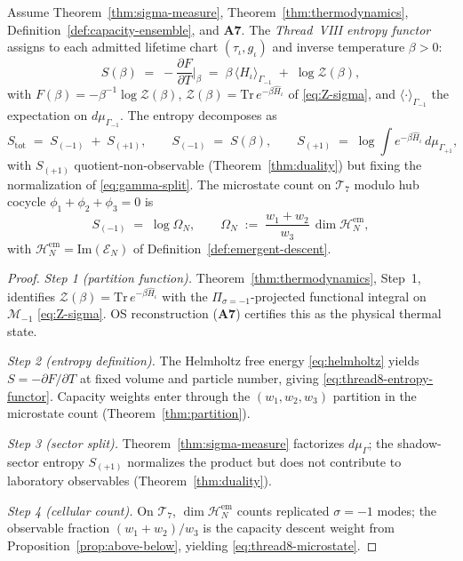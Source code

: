 \begin{theorem}
\label{thm:thread-8-entropy}
Assume Theorem~\ref{thm:sigma-measure}, Theorem~\ref{thm:thermodynamics},
Definition~\ref{def:capacity-ensemble}, and \textbf{A7}. The
\emph{Thread~VIII entropy functor} assigns to each admitted lifetime chart
$(\tau_\iota,g_\iota)$ and inverse temperature $\beta>0$:
\begin{equation}\label{eq:thread8-entropy-functor}
  S(\beta)
  \;=\;
  -\frac{\partial F}{\partial T}\Big|_{\beta}
  \;=\;
  \beta\,\langle\hat H_\iota\rangle_{\Gamma_{-1}}
  \;+\;
  \log\mathcal{Z}(\beta),
\end{equation}
with $F(\beta)=-\beta^{-1}\log\mathcal{Z}(\beta)$,
$\mathcal{Z}(\beta)=\mathrm{Tr}\,e^{-\beta\hat H_\iota}$ of
\eqref{eq:Z-sigma}, and $\langle\cdot\rangle_{\Gamma_{-1}}$ the expectation
on $d\mu_{\Gamma_{-1}}$. The entropy decomposes as
\begin{equation}\label{eq:thread8-entropy-split}
  S_{\mathrm{tot}}
  \;=\;
  S_{(-1)}
  \;+\;
  S_{(+1)},
  \qquad
  S_{(-1)}
  \;=\;
  S(\beta),
  \qquad
  S_{(+1)}
  \;=\;
  \log\!\int e^{-\beta\hat H_\iota}\,d\mu_{\Gamma_{+1}},
\end{equation}
with $S_{(+1)}$ quotient-non-observable (Theorem~\ref{thm:duality}) but
fixing the normalization of \eqref{eq:gamma-split}. The microstate count on
$\mathcal{T}_7$ modulo hub cocycle $\phi_1+\phi_2+\phi_3=0$ is
\begin{equation}\label{eq:thread8-microstate}
  S_{(-1)}
  \;=\;
  \log\Omega_N,
  \qquad
  \Omega_N
  \;:=\;
  \frac{w_1+w_2}{w_3}\,
  \dim\mathcal{H}_N^{\mathrm{em}},
\end{equation}
with $\mathcal{H}_N^{\mathrm{em}}=\mathrm{Im}(\mathcal{E}_N)$ of
Definition~\ref{def:emergent-descent}.
\end{theorem}

\begin{proof}
\emph{Step 1 (partition function).}
Theorem~\ref{thm:thermodynamics}, Step~1, identifies
$\mathcal{Z}(\beta)=\mathrm{Tr}\,e^{-\beta\hat H_\iota}$ with the
$\Pi_{\sigma=-1}$-projected functional integral on $\mathcal{M}_{-1}$
\eqref{eq:Z-sigma}. OS reconstruction (\textbf{A7}) certifies this as the
physical thermal state.

\emph{Step 2 (entropy definition).}
The Helmholtz free energy \eqref{eq:helmholtz} yields
$S=-\partial F/\partial T$ at fixed volume and particle number, giving
\eqref{eq:thread8-entropy-functor}. Capacity weights enter through the
$(w_1,w_2,w_3)$ partition in the microstate count
(Theorem~\ref{thm:partition}).

\emph{Step 3 (sector split).}
Theorem~\ref{thm:sigma-measure} factorizes $d\mu_\Gamma$; the shadow-sector
entropy $S_{(+1)}$ normalizes the product but does not contribute to
laboratory observables (Theorem~\ref{thm:duality}).

\emph{Step 4 (cellular count).}
On $\mathcal{T}_7$, $\dim\mathcal{H}_N^{\mathrm{em}}$ counts replicated
$\sigma=-1$ modes; the observable fraction $(w_1+w_2)/w_3$ is the capacity
descent weight from Proposition~\ref{prop:above-below}, yielding
\eqref{eq:thread8-microstate}.
\end{proof}

